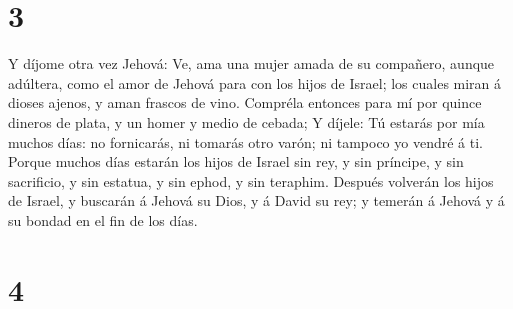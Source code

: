 \hypertarget{section-2}{%
\section{3}\label{section-2}}

 Y díjome otra vez Jehová: Ve, ama una mujer amada de su
compañero, aunque adúltera, como el amor de Jehová para con los hijos de
Israel; los cuales miran á dioses ajenos, y aman frascos de vino.
 Compréla entonces para mí por quince dineros de plata, y un
homer y medio de cebada;  Y díjele: Tú estarás por mía
muchos días: no fornicarás, ni tomarás otro varón; ni tampoco yo vendré
á ti.  Porque muchos días estarán los hijos de Israel sin
rey, y sin príncipe, y sin sacrificio, y sin estatua, y sin ephod, y sin
teraphim.  Después volverán los hijos de Israel, y buscarán
á Jehová su Dios, y á David su rey; y temerán á Jehová y á su bondad en
el fin de los días.

\hypertarget{section-3}{%
\section{4}\label{section-3}}

